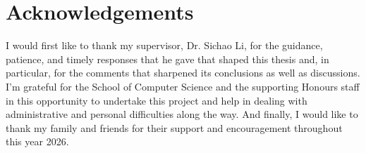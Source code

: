 \chapter*{Acknowledgements}

I would first like to thank my supervisor, Dr. Sichao Li, for the guidance, patience, and timely responses that he gave that shaped this thesis and, in particular, for the comments that sharpened its conclusions as well as discussions. I'm grateful for the School of Computer Science and the supporting Honours staff in this opportunity to undertake this project and help in dealing with administrative and personal difficulties along the way. And finally, I would like to thank my family and friends for their support and encouragement throughout this year 2026.
